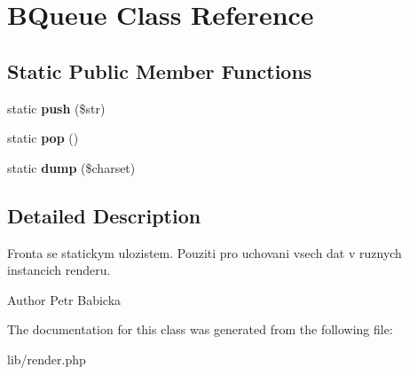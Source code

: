\section{BQueue Class Reference}
\label{class_b_queue}
\subsection*{Static Public Member Functions}
\begin{DoxyCompactItemize}
\item 
static {\bfseries push} (\$str)\label{class_b_queue_a728252eb0d1a948bbf5e8d4524b884f3}

\item 
static {\bfseries pop} ()\label{class_b_queue_afd8f881161bb8423dac2b69f9a6972dd}

\item 
static {\bfseries dump} (\$charset)\label{class_b_queue_a480da52f3014b9fcc8ef4bcbc78a56f7}

\end{DoxyCompactItemize}


\subsection{Detailed Description}
Fronta se statickym ulozistem. Pouziti pro uchovani vsech dat v ruznych instancich renderu. \begin{DoxyAuthor}{Author}
Petr Babicka 
\end{DoxyAuthor}


The documentation for this class was generated from the following file:\begin{DoxyCompactItemize}
\item 
lib/render.php\end{DoxyCompactItemize}
